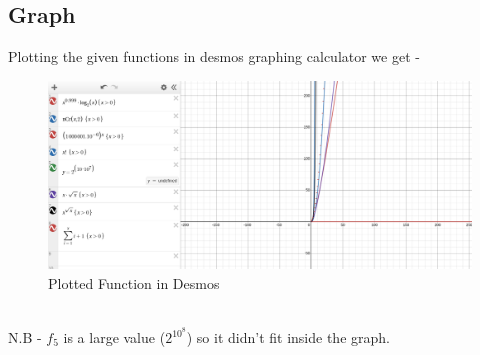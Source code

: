 \documentclass[12pt, a4paper]{article}
\begin{document}
\subsection{Graph}
Plotting the given functions in desmos graphing calculator we get -
\begin{figure}[h]
    \centering
    \includegraphics[width=1\linewidth]{image.png}
    \caption{Plotted Function in Desmos}
    \label{fig:enter-label}
\end{figure}
\\
N.B - $f_5$ is a large value ($2^{10^8}$) so it didn't fit inside the graph.
\end{document}
